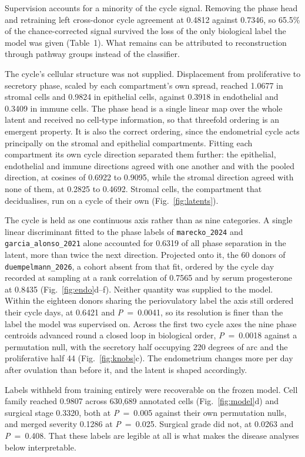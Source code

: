Supervision accounts for a minority of the cycle signal. Removing the phase
head and retraining left cross-donor cycle agreement at 0.4812 against
0.7346, so 65.5\% of the chance-corrected signal survived the loss of the
only biological label the model was given (Table~1). What remains can be 
attributed to reconstruction through pathway groups instead of the classifier.

The cycle's cellular structure was not supplied. Displacement from
proliferative to secretory phase, scaled by each compartment's own spread,
reached 1.0677 in stromal cells and 0.9824 in epithelial cells, against
0.3918 in endothelial and 0.3409 in immune cells. The phase head is a single
linear map over the whole latent and received no cell-type information, so
that threefold ordering is an emergent property. It is also the
correct ordering, since the endometrial cycle acts principally on the
stromal and epithelial compartments. Fitting each compartment its own cycle
direction separated them further: the epithelial, endothelial and immune
directions agreed with one another and with the pooled direction, at
cosines of 0.6922 to 0.9095, while the stromal direction agreed with none of
them, at 0.2825 to 0.4692. Stromal cells, the compartment that decidualises,
run on a cycle of their own (Fig.~\ref{fig:latents}).

The cycle is held as one continuous axis rather than as nine categories.
A single linear discriminant fitted to the phase labels of
\texttt{marecko\_2024} and \texttt{garcia\_alonso\_2021} alone accounted for
0.6319 of all phase separation in the latent, more than twice the next
direction. Projected onto it, the 60 donors
of \texttt{duempelmann\_2026}, a cohort absent from that fit, ordered by the
cycle day recorded at sampling at a rank correlation of 0.7565 and by serum
progesterone at 0.8435 (Fig.~\ref{fig:endo}d--f). Neither quantity was supplied to the model.
Within the eighteen donors sharing the periovulatory label the axis still
ordered their cycle days, at 0.6421 and \textit{P}~=~0.0041, so its resolution
is finer than the label the model was supervised on. Across the first two
cycle axes the nine phase centroids advanced round a closed loop in
biological order, \textit{P}~=~0.0018 against a permutation null, with the
secretory half occupying 220 degrees of arc and the proliferative half 44
(Fig.~\ref{fig:knobs}c).
The endometrium changes more per day after ovulation than before it, and
the latent is shaped accordingly.

Labels withheld from training entirely were recoverable on the frozen model.
Cell family reached 0.9807 across 630,689 annotated cells (Fig.~\ref{fig:model}d) and surgical
stage 0.3320, both at \textit{P}~=~0.005 against their own permutation nulls, and
merged severity 0.1286 at \textit{P}~=~0.025. Surgical grade did not, at 0.0263 and \textit{P}~=~0.408. That 
these labels are legible at all is what makes the disease analyses below 
interpretable.

